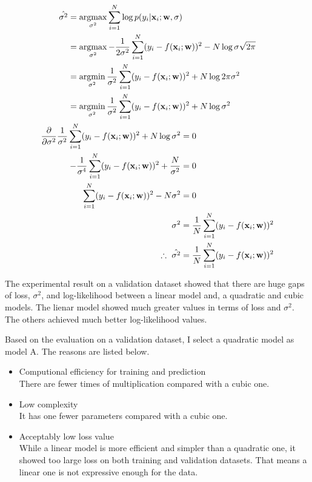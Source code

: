 \documentclass{introtosml}
\begin{document}
\begin{p}
  \item
    \begin{gather*}
      \begin{aligned}
        \hat{\sigma^2}
        & = \argmax_{\sigma^2} \sum_{i=1}^N \log p(y_i|\vec{x}_i; \vec{w}, \sigma) \\
        & = \argmax_{\sigma^2} - \frac{1}{2 \sigma^2}
            \sum_{i=1}^N (y_i - f(\vec{x}_i; \vec{w}))^2 - N \log \sigma \sqrt{2 \pi} \\
        & = \argmin_{\sigma^2} \frac{1}{\sigma^2}
            \sum_{i=1}^N (y_i - f(\vec{x}_i; \vec{w}))^2 + N \log 2 \pi \sigma^2 \\
        & = \argmin_{\sigma^2} \frac{1}{\sigma^2}
            \sum_{i=1}^N (y_i - f(\vec{x}_i; \vec{w}))^2 + N \log \sigma^2
      \end{aligned} \\
      \begin{aligned}
      \frac{\partial}{\partial \sigma^2} \frac{1}{\sigma^2}
          \sum_{i=1}^N (y_i - f(\vec{x}_i; \vec{w}))^2 + N \log \sigma^2 & = 0 \\
      - \frac{1}{\sigma^4}
          \sum_{i=1}^N (y_i - f(\vec{x}_i; \vec{w}))^2 + \frac{N}{\sigma^2} & = 0 \\
      \sum_{i=1}^N (y_i - f(\vec{x}_i; \vec{w}))^2 - N \sigma^2 & = 0 \\
      \sigma^2 & = \frac{1}{N} \sum_{i=1}^N (y_i - f(\vec{x}_i; \vec{w}))^2 \\
      \therefore \hat{\sigma^2} & = \frac{1}{N} \sum_{i=1}^N (y_i - f(\vec{x}_i; \vec{w}))^2
      \end{aligned}
    \end{gather*}

    The experimental result on a validation dataset showed that there are huge
    gaps of loss, $\sigma^2$, and log-likelihood between a linear model and, a quadratic
    and cubic models.
    The lienar model showed much greater values in terms of loss and $\sigma^2$.
    The others achieved much better log-likelihood values.

    Based on the evaluation on a validation dataset, I select a quadratic model
    as model A.
    The reasons are listed below.
    \begin{itemize}
      \item Computional efficiency for training and prediction \\
            There are fewer times of multiplication compared with a cubic one.
      \item Low complexity \\
            It has one fewer parameters compared with a cubic one.
      \item Acceptably low loss value \\
            While a linear model is more efficient and simpler than a quadratic one,
            it showed too large loss on both training and validation datasets.
            That means a linear one is not expressive enough for the data.
    \end{itemize}


\end{p}
\end{document}
